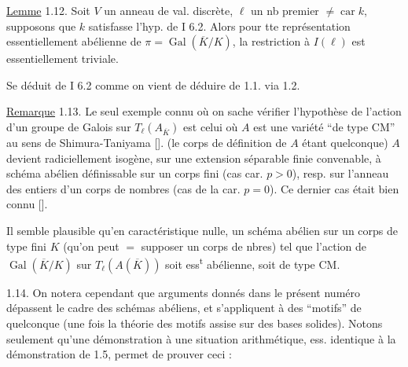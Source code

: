 \uline{Lemme} 1.12. Soit $V$ un anneau de val. discrète,   $\ell$ un nb premier $\ne\operatorname{car} k$, supposons que $k$ satisfasse l'hyp. de I 6.2.  Alors pour tte représentation  essentiellement abélienne de $\pi=\operatorname{Gal}(\overline K/K)$, la restriction à $I(\ell)$ est essentiellement triviale.

Se déduit de I 6.2 comme  on vient de déduire  de 1.1. via 1.2.


\uline{Remarque} 1.13.  Le seul exemple connu où on sache vérifier l'hypothèse  de l'action   d'un groupe de Galois sur  $T_\ell(A_{\overline K})$ est celui où $A$ est une variété ``de type CM'' au sens de Shimura-Taniyama [\quad].    (le corps de définition de $A$ étant quelconque) $A$ devient radiciellement isogène, sur une extension  séparable finie convenable, à  schéma abélien définissable sur un corps fini (cas car. $p>0$), resp. sur l'anneau des entiers d'un corps de nombres (cas de la car. $p=0$). Ce dernier cas  était bien connu [\quad].

Il semble plausible qu'en caractéristique
nulle,  un schéma abélien sur un corps de type fini $K$ (qu'on peut $=$ supposer un corps de nbres) tel que l'action de $\operatorname{Gal}(\overline K/K)$ sur $T_\ell(A(\overline K))$ soit ess\textsuperscript{t} abélienne,  soit de type CM.

1.14. On notera cependant que   arguments donnés dans le présent numéro dépassent le cadre des schémas abéliens, et s'appliquent   à des ``motifs'' de   quelconque (une fois la théorie des motifs assise sur des bases solides). Notons seulement qu'une démonstration  à une situation arithmétique, ess. identique à la démonstration de 1.5, permet de prouver ceci :

